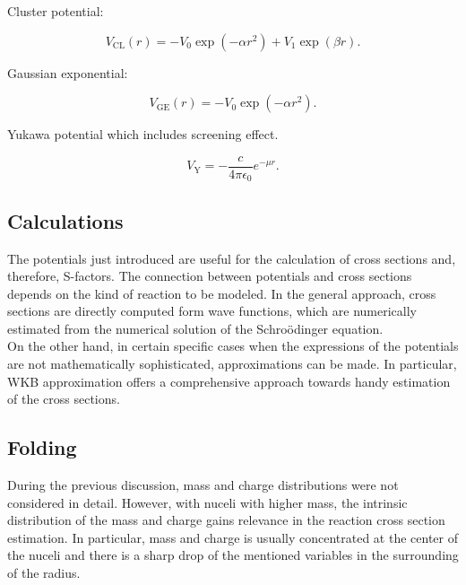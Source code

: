 \documentclass[openany]{book}
\begin{document}
Cluster potential:

\begin{equation} \label{eq:potential_cluster}
	V_{\mathrm{CL}}(r) = - V_0 \exp{(-\alpha r^2 )} + V_1 \exp{(\beta r)}.
\end{equation}

Gaussian exponential: 

\begin{equation} \label{eq:potential_gaussianExponential}
	V_{\mathrm{GE}}(r) = - V_0 \exp{(-\alpha r^2 )}.
\end{equation}

Yukawa potential  which includes screening effect.

\begin{equation} \label{eq:potential_Yukawa}
	V_{\mathrm{Y}} = -\frac{c}{4\pi\epsilon_0}e^{-\mu r}.
\end{equation}

\subsection{Calculations}  \label{sub:potential_calculations}

The potentials just introduced are useful for the calculation of cross sections and, therefore, S-factors. The connection between potentials and cross sections depends on the kind of reaction to be modeled. In the general approach, cross sections are directly computed form wave functions,  which are numerically estimated from the numerical solution of the Schroödinger equation. \\

On the other hand, in certain specific cases when the expressions of the potentials are not mathematically sophisticated, approximations can be made. In particular, WKB approximation offers a comprehensive approach towards handy estimation of the cross sections. 

\subsection{Folding} \label{sub:potential_folding}

During the previous discussion, mass and charge distributions were not considered in detail. However, with nuceli with higher mass, the intrinsic distribution of the mass and charge gains relevance in the reaction cross section estimation. In particular, mass and charge is usually concentrated at the center of the nuceli and there is a sharp drop of the mentioned variables in the surrounding of the radius. \\
\end{document}
